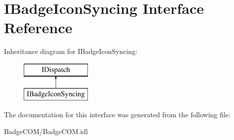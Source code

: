 \hypertarget{interface_i_badge_icon_syncing}{\section{I\-Badge\-Icon\-Syncing Interface Reference}
\label{interface_i_badge_icon_syncing}
}
Inheritance diagram for I\-Badge\-Icon\-Syncing\-:\begin{figure}[H]
\begin{center}
\leavevmode
\includegraphics[height=2.000000cm]{interface_i_badge_icon_syncing}
\end{center}
\end{figure}


The documentation for this interface was generated from the following file\-:\begin{DoxyCompactItemize}
\item 
Badge\-C\-O\-M/Badge\-C\-O\-M.\-idl\end{DoxyCompactItemize}
